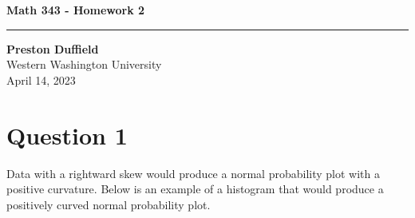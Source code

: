 \documentclass{article}
\begin{document}
\noindent
\begin{minipage}[t]{0.6\textwidth}
    \begin{flushleft}
        \LARGE\textbf{Math 343 - Homework 2} \\
        \vspace{6pt} %
        \hrule width 10cm
        \vspace{12pt}
        \large\textbf{Preston Duffield} \\
        \large Western Washington University \\
        April 14, 2023
        \vspace{24pt}
    \end{flushleft}
\end{minipage}

\section*{Question 1}

Data with a rightward skew would produce a normal probability plot with a positive curvature.
Below is an example of a histogram that would produce a positively curved normal probability plot. \\
\end{document}
